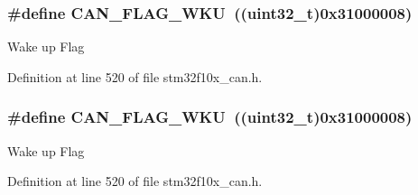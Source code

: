\subsubsection[{\texorpdfstring{C\+A\+N\+\_\+\+F\+L\+A\+G\+\_\+\+W\+KU}{CAN_FLAG_WKU}}]{\setlength{\rightskip}{0pt plus 5cm}\#define C\+A\+N\+\_\+\+F\+L\+A\+G\+\_\+\+W\+KU~(({\bf uint32\+\_\+t})0x31000008)}\hypertarget{group___c_a_n__flags_ga18c72dbe75cb80e8b5126c23c9120818}{}\label{group___c_a_n__flags_ga18c72dbe75cb80e8b5126c23c9120818}
Wake up Flag 

Definition at line 520 of file stm32f10x\+\_\+can.\+h.

\subsubsection[{\texorpdfstring{C\+A\+N\+\_\+\+F\+L\+A\+G\+\_\+\+W\+KU}{CAN_FLAG_WKU}}]{\setlength{\rightskip}{0pt plus 5cm}\#define C\+A\+N\+\_\+\+F\+L\+A\+G\+\_\+\+W\+KU~(({\bf uint32\+\_\+t})0x31000008)}\hypertarget{group___c_a_n__flags_ga18c72dbe75cb80e8b5126c23c9120818}{}\label{group___c_a_n__flags_ga18c72dbe75cb80e8b5126c23c9120818}
Wake up Flag 

Definition at line 520 of file stm32f10x\+\_\+can.\+h.

